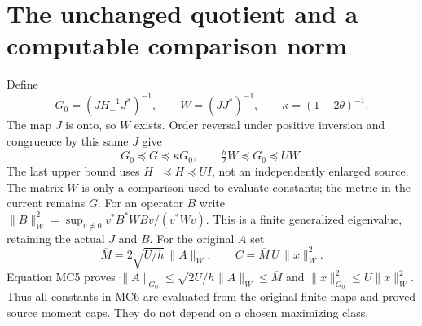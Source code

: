 \section{The unchanged quotient and a computable comparison norm}
Define
\[
 G_0=(JH_-^{-1}J^*)^{-1},\qquad W=(JJ^*)^{-1},\qquad
 \kappa=(1-2\theta)^{-1}.
\]
The map $J$ is onto, so $W$ exists. Order reversal under positive
inversion and congruence by this same $J$ give
\[
 G_0\preceq G\preceq\kappa G_0,\qquad
 \tfrac h2 W\preceq G_0\preceq UW.                            \tag{MC5}
\]
The last upper bound uses $H_-\preceq H\preceq UI$, not an
independently enlarged source. The matrix $W$ is only a comparison
used to evaluate constants; the metric in the current remains $G$.
For an operator $B$ write
$\|B\|_W^2=\sup_{v\ne0}v^*B^*WBv/(v^*Wv)$. This is a finite
generalized eigenvalue, retaining the actual $J$ and $B$.
For the original $A$ set
\[
 \overline M=2\sqrt{U/h}\,\|A\|_W,\qquad
 C=\overline M\,U\,\|x\|_W^2.                                \tag{MC6}
\]
Equation MC5 proves $\|A\|_{G_0}\le\sqrt{2U/h}\|A\|_W
\le\overline M$ and $\|x\|_{G_0}^2\le U\|x\|_W^2$.
Thus all constants in MC6 are evaluated from the original finite maps
and proved source moment caps. They do not depend on a chosen
maximizing class.

